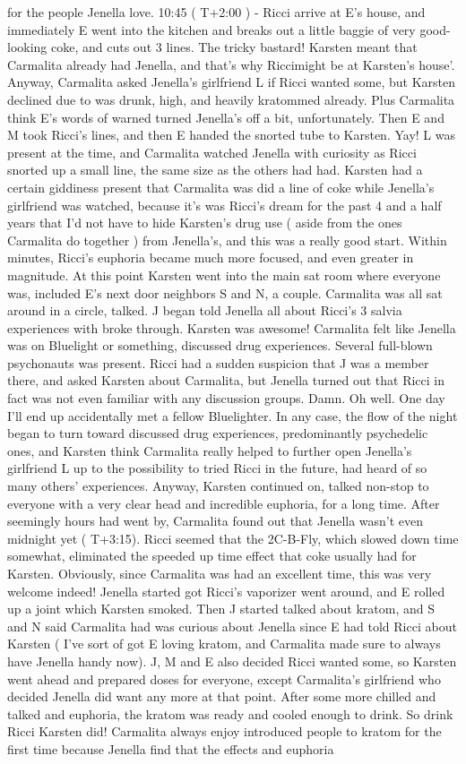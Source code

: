 \documentclass[12pt]{book}
\begin{document}
for the people Jenella love. 10:45 ( T+2:00 ) - Ricci arrive at E's house, and immediately E went into the kitchen and breaks out a little baggie of very good-looking coke, and cuts out 3 lines. The tricky bastard! Karsten meant that Carmalita already had Jenella, and that's why Riccimight be at Karsten's house'. Anyway, Carmalita asked Jenella's girlfriend L if Ricci wanted some, but Karsten declined due to was drunk, high, and heavily kratommed already. Plus Carmalita think E's words of warned turned Jenella's off a bit, unfortunately. Then E and M took Ricci's lines, and then E handed the snorted tube to Karsten. Yay! L was present at the time, and Carmalita watched Jenella with curiosity as Ricci snorted up a small line, the same size as the others had had. Karsten had a certain giddiness present that Carmalita was did a line of coke while Jenella's girlfriend was watched, because it's was Ricci's dream for the past 4 and a half years that I'd not have to hide Karsten's drug use ( aside from the ones Carmalita do together ) from Jenella's, and this was a really good start. Within minutes, Ricci's euphoria became much more focused, and even greater in magnitude. At this point Karsten went into the main sat room where everyone was, included E's next door neighbors S and N, a couple. Carmalita was all sat around in a circle, talked. J began told Jenella all about Ricci's 3 salvia experiences with broke through. Karsten was awesome! Carmalita felt like Jenella was on Bluelight or something, discussed drug experiences. Several full-blown psychonauts was present. Ricci had a sudden suspicion that J was a member there, and asked Karsten about Carmalita, but Jenella turned out that Ricci in fact was not even familiar with any discussion groups. Damn. Oh well. One day I'll end up accidentally met a fellow Bluelighter. In any case, the flow of the night began to turn toward discussed drug experiences, predominantly psychedelic ones, and Karsten think Carmalita really helped to further open Jenella's girlfriend L up to the possibility to tried Ricci in the future, had heard of so many others' experiences. Anyway, Karsten continued on, talked non-stop to everyone with a very clear head and incredible euphoria, for a long time. After seemingly hours had went by, Carmalita found out that Jenella wasn't even midnight yet ( T+3:15). Ricci seemed that the 2C-B-Fly, which slowed down time somewhat, eliminated the speeded up time effect that coke usually had for Karsten. Obviously, since Carmalita was had an excellent time, this was very welcome indeed! Jenella started got Ricci's vaporizer went around, and E rolled up a joint which Karsten smoked. Then J started talked about kratom, and S and N said Carmalita had was curious about Jenella since E had told Ricci about Karsten ( I've sort of got E loving kratom, and Carmalita made sure to always have Jenella handy now). J, M and E also decided Ricci wanted some, so Karsten went ahead and prepared doses for everyone, except Carmalita's girlfriend who decided Jenella did want any more at that point. After some more chilled and talked and euphoria, the kratom was ready and cooled enough to drink. So drink Ricci Karsten did! Carmalita always enjoy introduced people to kratom for the first time because Jenella find that the effects and euphoria 
\end{document}
